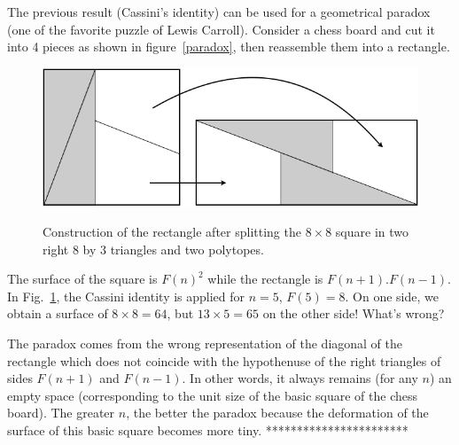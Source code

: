 {The previous result (Cassini's identity) can be used for a geometrical paradox (one of the favorite puzzle of Lewis Carroll).
Consider a chess board and cut it into 4 pieces as shown in figure~\ref{paradox}, then reassemble them into a rectangle.
%
\begin{figure}[htb]
\begin{center}
\label{paradox}
       \includegraphics[scale=0.4]{FiguresMaths//FiboParadox.png}
              \caption{Construction of the rectangle after splitting the $8 \times 8$ square
              in two right $8$ by $3$ triangles and two polytopes.}
        \label{fig:FiboParadox}
\end{center}
\end{figure}

The surface of the square is $F(n)^2$ while the rectangle is $F(n+1).F(n-1)$.
In Fig.~\ref{fig:FiboParadox}, the Cassini identity is applied for $n=5$, $F(5)=8$. 
On one side, we obtain a surface of $8 \times 8 = 64$, but $13 \times 5 = 65$ on the other side!
What's wrong?

The paradox comes from the wrong representation of the diagonal of the rectangle which does not coincide with the hypothenuse
of the right triangles of sides $F(n+1)$ and $F(n-1)$.
In other words, it always remains (for any $n$) an empty space (corresponding to the unit size of the basic square of the chess board).
The greater $n$, the better the paradox because the deformation of the surface of this basic square becomes more tiny. 
***********************}

%
%





